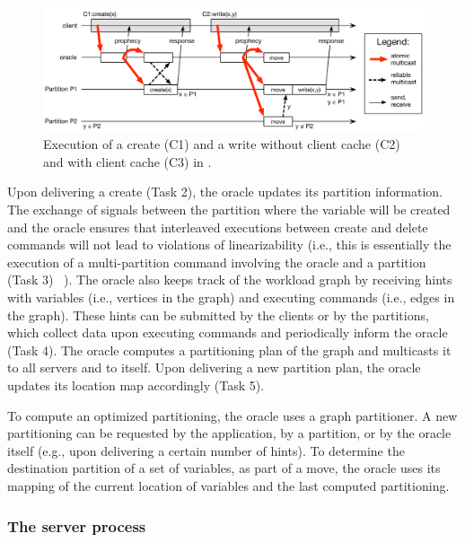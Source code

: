 \begin{figure}[h!]
\begin{minipage}[b]{1\linewidth}
\centering
      \includegraphics[width=\linewidth]{figures/dynastar}
\end{minipage}
\caption{Execution of a create (C1) and a write without client cache (C2) and with client cache (C3) in \dynastar.}
\label{fig:oracle_repartition}
\end{figure}

Upon delivering a create (Task 2), the oracle updates its partition information.
The exchange of signals between the partition where the variable will be created
and the oracle ensures that interleaved executions between create and delete
commands will not lead to violations of linearizability (i.e., this is
essentially the execution of a multi-partition command involving the oracle and
a partition (Task 3) ~\cite{bezerra2014ssmr}). The oracle also keeps track of
the workload graph by receiving hints with variables (i.e., vertices in the
graph) and executing commands (i.e., edges in the graph). These hints can be
submitted by the clients or by the partitions, which collect data upon executing
commands and periodically inform the oracle (Task 4). The oracle computes a
partitioning plan of the graph and multicasts it to all servers and to itself.
Upon delivering a new partition plan, the oracle updates its location map
accordingly (Task 5).

To compute an optimized partitioning, the oracle uses a graph partitioner. A new
partitioning can be requested by the application, by a partition, or by the
oracle itself (e.g., upon delivering a certain number of hints). To determine
the destination partition of a set of variables, as part of a move, the oracle
uses its mapping of the current location of variables and the last computed
partitioning.

\subsubsection{The server process}

